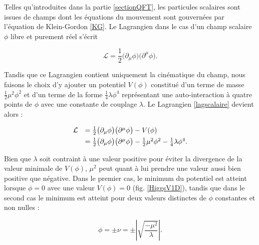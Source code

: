        Telles qu'introduites dans la partie \ref{sectionQFT}, les particules scalaires sont issues de champs dont les équations du mouvement sont gouvernées par l'équation de Klein-Gordon \ref{KG}. Le Lagrangien dans le cas d'un champ scalaire $\phi$ libre et purement réel s'écrit

        \begin{equation}
            \mathcal{L}=\frac{1}{2}\bigl(\partial_{\mu}\phi\bigr)\bigl(\partial^{\mu}\phi\bigr).
        \label{lagscalaire}
        \end{equation}

        Tandis que ce Lagrangien contient uniquement la cinématique du champ, nous faisons le choix d'y ajouter un potentiel $V(\phi)$ constitué d'un terme de masse $\frac{1}{2}\mu^2\phi^2$ et d'un terme de la forme $\frac{1}{4}\lambda\phi^4$ représentant une auto-interaction à quatre points de $\phi$ avec une constante de couplage $\lambda$. Le Lagrangien \ref{lagscalaire} devient alors :

        \begin{equation}
        \begin{array}{ll}
            \mathcal{L}&=\frac{1}{2}\bigl(\partial_{\mu}\phi\bigr)\bigl(\partial^{\mu}\phi\bigr)-V(\phi) \vspace{4pt}\\
                       &=\frac{1}{2}\bigl(\partial_{\mu}\phi\bigr)\bigl(\partial^{\mu}\phi\bigr)-\frac{1}{2}\mu^2\phi^2-\frac{1}{4}\lambda\phi^4.
        \end{array}
        \label{laghiggs}
        \end{equation}

        Bien que $\lambda$ soit contraint à une valeur positive pour éviter la divergence de la valeur minimale de $V(\phi)$, $\mu^2$ peut quant à lui prendre une valeur aussi bien positive que négative. Dans le premier cas, le minimum du potentiel est atteint lorsque $\phi=0$ avec une valeur $V(\phi)=0$ (fig. \ref{HiggsV1D}), tandis que dans le second cas le minimum est atteint pour deux valeurs distinctes de $\phi$ constantes et non nulles :

        \begin{equation}
            \phi=\pm\nu=\pm\displaystyle\left\lvert \sqrt{\frac{-\mu^2}{\lambda}} \right\rvert.
        \end{equation}

